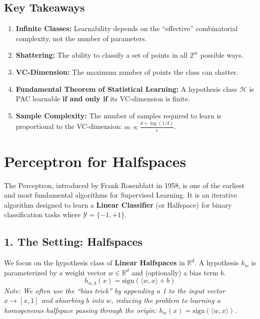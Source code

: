 \documentclass[
  italian,
  11pt,
]{article}
\providecommand{\tightlist}{%
  \setlength{\itemsep}{0pt}\setlength{\parskip}{0pt}}
\begin{document}
\subsection{Key Takeaways}\label{key-takeaways-4}

\begin{enumerate}
\def\labelenumi{\arabic{enumi}.}
\tightlist
\item
  \textbf{Infinite Classes:} Learnability depends on the ``effective''
  combinatorial complexity, not the number of parameters.
\item
  \textbf{Shattering:} The ability to classify a set of points in all
  \(2^m\) possible ways.
\item
  \textbf{VC-Dimension:} The maximum number of points the class can
  shatter.
\item
  \textbf{Fundamental Theorem of Statistical Learning:} A hypothesis
  class \(\mathcal{H}\) is PAC learnable \textbf{if and only if} its
  VC-dimension is finite.
\item
  \textbf{Sample Complexity:} The number of samples required to learn is
  proportional to the VC-dimension:
  \(m \propto \frac{d + \log(1/\delta)}{\epsilon}\).
\end{enumerate}

\newpage

\section{Perceptron for Halfspaces}\label{perceptron-for-halfspaces}

The Perceptron, introduced by Frank Rosenblatt in 1958, is one of the
earliest and most fundamental algorithms for Supervised Learning. It is
an iterative algorithm designed to learn a \textbf{Linear Classifier}
(or Halfspace) for binary classification tasks where
\(\mathcal{Y} = \{-1, +1\}\).

\subsection{1. The Setting: Halfspaces}\label{the-setting-halfspaces}

We focus on the hypothesis class of \textbf{Linear Halfspaces} in
\(\mathbb{R}^d\). A hypothesis \(h_w\) is parameterized by a weight
vector \(w \in \mathbb{R}^d\) and (optionally) a bias term \(b\).
\[ h_{w,b}(x) = \text{sign}(\langle w, x \rangle + b) \] \emph{Note: We
often use the ``bias trick'' by appending a 1 to the input vector
\(x \to [x, 1]\) and absorbing \(b\) into \(w\), reducing the problem to
learning a homogeneous halfspace passing through the origin:
\(h_w(x) = \text{sign}(\langle w, x \rangle)\).}
\end{document}
